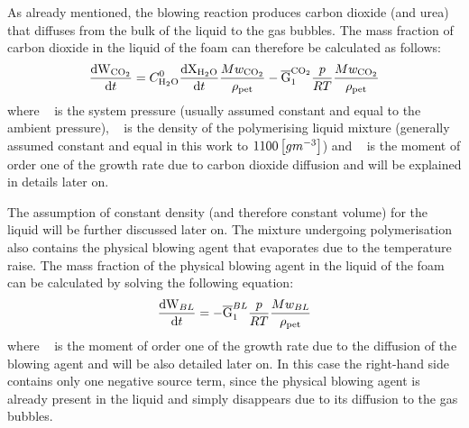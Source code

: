 As already mentioned, the blowing reaction produces carbon dioxide (and urea) that diffuses from the bulk of the liquid to the gas bubbles. 
The mass fraction of carbon dioxide in the liquid of the foam can therefore be calculated as follows:
\begin{equation}
        \frac{\mathrm{d} \mathrm{W}_{\mathrm{C}\mathrm{O}_2}}{\mathrm{d}t} = 
        C^0_{\mathrm{H}_2\mathrm{O}}
        \frac{\mathrm{d}\mathrm{X}_{\mathrm{H}_2\mathrm{O}}}{\mathrm{d}t}
        \frac{ Mw_{\mathrm{C}\mathrm{O}_2} }{ \rho_{\mathrm{pet}} } -
        \overline{\mathrm{G}}_{1}^{\mathrm{C}\mathrm{O}_2}
        \frac{p}{R T}
        \frac{ Mw_{\mathrm{C}\mathrm{O}_2} }{ \rho_{\mathrm{pet}} } 
\end{equation}
where {~\Pressure} is the system pressure (usually assumed constant and equal to the ambient pressure), {~\DensityPolyurethane } is the density of the polymerising liquid mixture (generally assumed constant and equal in this work to $1100 \left[ g m^{-3} \right]$) and {~\SpecieGrowthRateMomentOneCarbonDiOxide} is the moment of order one of the growth rate due to carbon dioxide diffusion and will be explained in details later on. 
%
\par
%
The assumption of constant density (and therefore constant volume) for the liquid will be further discussed later on.
The mixture undergoing polymerisation also contains the physical blowing agent that evaporates due to the temperature raise. The mass fraction of the physical blowing agent in the liquid of the foam can be calculated by solving the following equation:
\begin{equation}
    \frac{\mathrm{d} \mathrm{W}_{BL}}{\mathrm{d}t} = 
    - \overline{\mathrm{G}}_{1}^{BL} \frac{p}{R T} 
    \frac{ Mw_{BL} }{ \rho_{\mathrm{pet}} } \label{eq:Tiger}
\end{equation}
where {~\SpecieGrowthRateMomentOneBlowingAgent} is the moment of order one of the growth rate due to the diffusion of the blowing agent and will be also detailed later on. 
In this case the right-hand side contains only one negative source term, since the physical blowing agent is already present in the liquid and simply disappears due to its diffusion to the gas bubbles.

